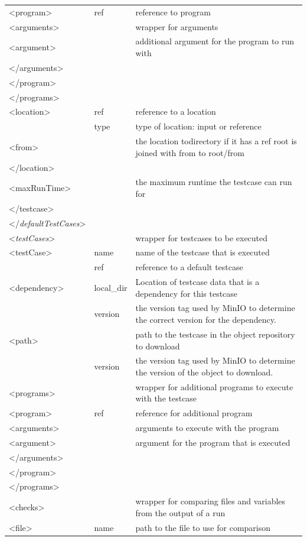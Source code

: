 \documentclass{deltares_memo}
\begin{document}
\begin{longtable}{p{30mm}p{45mm}p{\textwidth - 75mm - 36pt}}
<program> & ref & reference to program \\
<arguments> & & wrapper for arguments \\
<argument> & & additional argument for the program to run with \\
</arguments> & & \\
</program> & & \\
</programs> & & \\
<location> & ref & reference to a location\\
     & type & type of location: input or reference\\
<from> & & the location todirectory if it has a ref root is joined with from to root/from \\
</location> & & \\
<maxRunTime> & & the maximum runtime the testcase can run for \\
</testcase> & & \\
</\emph{defaultTestCases}> & & \\
\newpage
<\emph{testCases}> & & wrapper for testcases to be executed \\
<testCase> & name & name of the testcase that is executed \\
     & ref & reference to a default testcase \\
<dependency> & local\_dir & Location of testcase data that is a dependency for this testcase \\
    & version & the version tag used by MinIO to determine the correct version for the dependency. \\
<path> & & path to the testcase in the object repository to download \\
    & version & the version tag used by MinIO to determine the version of the object to download. \\
<programs> & & wrapper for additional programs to execute with the testcase \\
<program> & ref & reference for additional program \\
<arguments> & & arguments to execute with the program \\
<argument> & & argument for the program that is executed \\
</arguments> & & \\
</program> & & \\
</programs> & & \\
<checks> & & wrapper for comparing files and variables from the output of a run \\
<file> & name & path to the file to use for comparison \\

\end{longtable}
\end{document}
